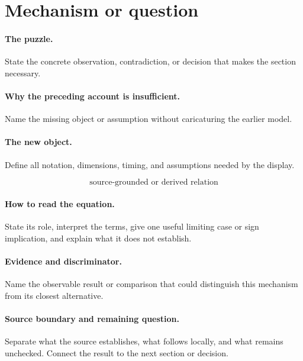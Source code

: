 \section{Mechanism or question}

\paragraph{The puzzle.}
State the concrete observation, contradiction, or decision that makes the
section necessary.

\paragraph{Why the preceding account is insufficient.}
Name the missing object or assumption without caricaturing the earlier model.

\paragraph{The new object.}
Define all notation, dimensions, timing, and assumptions needed by the display.

\begin{equation}
  \text{source-grounded or derived relation}
  \label{eq:replace-with-descriptive-label}
\end{equation}

\paragraph{How to read the equation.}
State its role, interpret the terms, give one useful limiting case or sign
implication, and explain what it does not establish.

\paragraph{Evidence and discriminator.}
Name the observable result or comparison that could distinguish this mechanism
from its closest alternative.

\paragraph{Source boundary and remaining question.}
Separate what the source establishes, what follows locally, and what remains
unchecked. Connect the result to the next section or decision.
